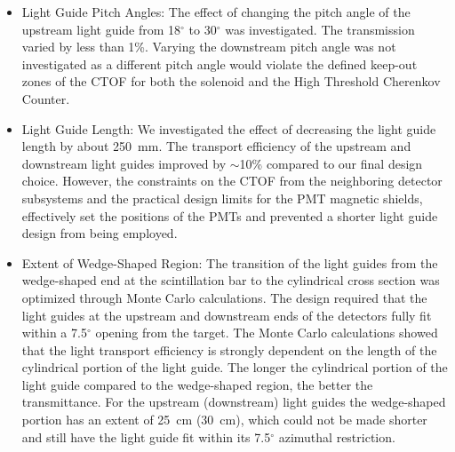 \documentclass{elsart}
\begin{document}
\begin{itemize}

\item Light Guide Pitch Angles: The effect of changing the pitch angle of the upstream light 
guide from 18$^\circ$ to 30$^\circ$ was investigated. The transmission varied by less than 1\%. 
Varying the downstream pitch angle was not investigated as a different pitch angle would 
violate the defined keep-out zones of the CTOF for both the solenoid and the High Threshold 
Cherenkov Counter.

\vskip 0.5cm

\item Light Guide Length: We investigated the effect of decreasing the light guide length by 
about 250~mm. The transport efficiency of the upstream and downstream light guides improved 
by $\sim$10\% compared to our final design choice. However, the constraints on the CTOF from 
the neighboring detector subsystems and the practical design limits for the PMT magnetic 
shields, effectively set the positions of the PMTs and prevented a shorter light guide design 
from being employed.

\vskip 0.5cm

\item Extent of Wedge-Shaped Region: The transition of the light guides from the wedge-shaped 
end at the scintillation bar to the cylindrical cross section was optimized through Monte Carlo
calculations. The design required that the light guides at the upstream and downstream ends of
the detectors fully fit within a 7.5$^\circ$ opening from the target. The Monte Carlo calculations
showed that the light transport efficiency is strongly dependent on the length of the cylindrical
portion of the light guide. The longer the cylindrical portion of the light guide compared to the
wedge-shaped region, the better the transmittance. For the upstream (downstream) light guides
the wedge-shaped portion has an extent of 25~cm (30~cm), which could not be made shorter and
still have the light guide fit within its 7.5$^\circ$ azimuthal restriction.

\vskip 0.5cm


\end{itemize}
\end{document}
